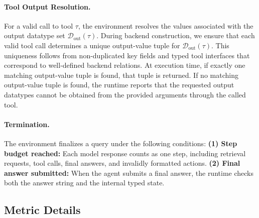 \documentclass{llmxive}
\begin{document}
\paragraph{Tool Output Resolution.}
For a valid call to tool $\tau$, the environment resolves the values associated with the output datatype set $\mathcal{D}_{\mathrm{out}}(\tau)$.
During backend construction, we ensure that each valid tool call determines a unique output-value tuple for $\mathcal{D}_{\mathrm{out}}(\tau)$.
This uniqueness follows from non-duplicated key fields and typed tool interfaces that correspond to well-defined backend relations.
At execution time, if exactly one matching output-value tuple is found, that tuple is returned.
If no matching output-value tuple is found, the runtime reports that the requested output datatypes cannot be obtained from the provided arguments through the called tool.

\paragraph{Termination.}
The environment finalizes a query under the following conditions:
\textbf{(1) Step budget reached:} Each model response counts as one step, including retrieval requests, tool calls, final answers, and invalidly formatted actions.
\textbf{(2) Final answer submitted:} When the agent submits a final answer, the runtime checks both the answer string and the internal typed state. 

\subsection{Metric Details}
\label{app:metric-details}
\end{document}
